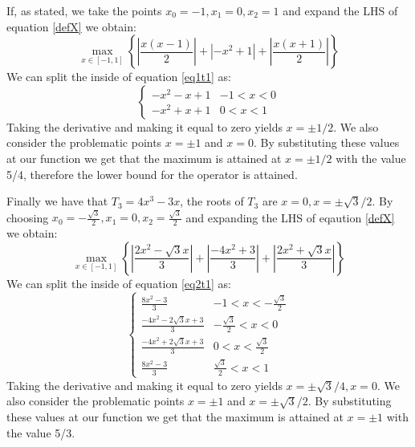 \begin{solution}
  If, as stated, we take the points $x_0 = -1, x_1 = 0, x_2 = 1$ and
  expand the LHS of equation \ref{defX} we obtain:
  \begin{equation}
    \max_{x \in [-1,1]} \left \{ \left | \frac{x(x-1)}{2} \right | + \left | -x^2+1 \right | + \left | \frac{x(x+1)}{2} \right | \right \}
    \label{eq1t1}
  \end{equation}
  We can split the inside of equation \ref{eq1t1} as:
  \[ \begin{cases} 
      -x^2-x+1  &-1< x< 0 \\
      -x^2+x+1  &0< x<1 
    \end{cases}
  \]
  Taking the derivative and making it equal to zero yields
  $x = \pm 1/2$. We also consider the problematic points $x = \pm 1$
  and $x = 0$. By substituting these values at our function we get
  that the maximum is attained at $x=\pm 1/2$ with the value 5/4,
  therefore the lower bound for the operator is attained.

  Finally we have that $T_3 = 4x^3-3x$, the roots of $T_3$ are
  $x=0, x=\pm \sqrt{3}/2$. By choosing
  $x_0 = -\frac{\sqrt{3}}{2}, x_1 = 0, x_2 = \frac{\sqrt{3}}{2}$ and
  expanding the LHS of eqaution \ref{defX} we obtain:
  \begin{equation}
    \max_{x \in [-1,1]} \left \{ \left | \frac{2x^2-\sqrt{3}x}{3} \right | + \left | \frac{-4x^2+3}{3} \right | + \left | \frac{2x^2+\sqrt{3}x}{3} \right | \right \}
    \label{eq2t1}
  \end{equation}
  We can split the inside of equation \ref{eq2t1} as:
  \[ \begin{cases} 
      \frac{8x^2-3}{3}  &-1< x< -\frac{\sqrt{3}}{2} \\
      \frac{-4x^2-2\sqrt{3}x+3}{3}  &-\frac{\sqrt{3}}{2}< x< 0 \\
      \frac{-4x^2+2\sqrt{3}x+3}{3} & 0 < x < \frac{\sqrt{3}}{2} \\
      \frac{8x^2-3}{3} & \frac{\sqrt{3}}{2}<x<1 
    \end{cases}
  \]
  Taking the derivative and making it equal to zero yields
  $x = \pm \sqrt{3}/4, x = 0$. We also consider the problematic points
  $x = \pm 1$ and $x = \pm \sqrt{3}/2$. By substituting these values
  at our function we get that the maximum is attained at $x=\pm 1$
  with the value 5/3.
\end{solution}

